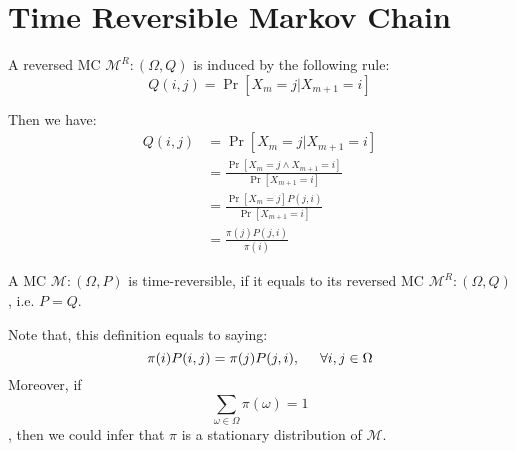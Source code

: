 \section{Time Reversible Markov Chain}
\begin{define}
  A reversed MC $\mathcal{M}^R: (\Omega, Q)$ is induced by the following rule:
  \[
    Q(i, j) = \Pr[X_m=j|X_{m+1}=i]
  \]
\end{define}
Then we have:
\begin{align*}
    Q(i, j) &= \Pr[X_m=j|X_{m+1}=i] \\
    &= \frac{\Pr[X_m=j\land X_{m+1}=i]}{\Pr[X_{m+1}=i]} \\
    &= \frac{\Pr[X_m = j] P(j, i)}{\Pr[X_{m+1} = i]} \\
    &= \frac{\pi(j)P(j,i)}{\pi(i)}
\end{align*}

\begin{define}
  A MC $\mathcal{M}: (\Omega, P)$ is time-reversible, if it equals to its reversed MC $\mathcal{M}^R: (\Omega, Q)$, i.e. $P = Q$.
\end{define}
Note that, this definition equals to saying:
\[
  \pi(i)P(i, j) = \pi(j)P(j,i),\hspace{0.5cm} \forall i, j\in\Omega
\] 
Moreover, if \[\sum_{\omega\in\Omega}\pi(\omega) = 1\], then we could infer that $\pi$ is a stationary distribution of $\mathcal{M}$.
